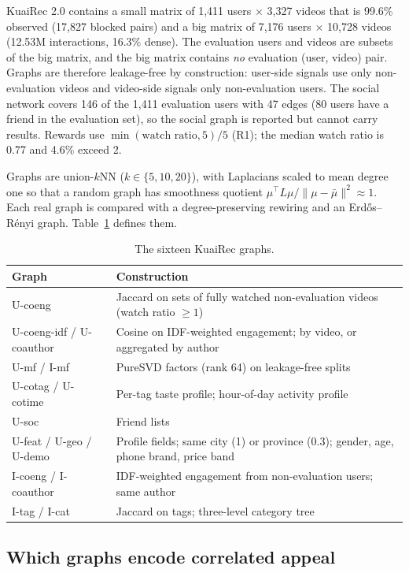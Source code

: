 \documentclass[11pt]{article}
\theoremstyle{definition}
\theoremstyle{remark}
\begin{document}
KuaiRec 2.0 contains a small matrix of 1,411 users $\times$ 3,327 videos that is 99.6\% observed (17,827 blocked pairs) and a big matrix of 7,176 users $\times$ 10,728 videos (12.53M interactions, 16.3\% dense). The evaluation users and videos are subsets of the big matrix, and the big matrix contains \emph{no} evaluation (user, video) pair. Graphs are therefore leakage-free by construction: user-side signals use only non-evaluation videos and video-side signals only non-evaluation users. The social network covers 146 of the 1,411 evaluation users with 47 edges (80 users have a friend in the evaluation set), so the social graph is reported but cannot carry results. Rewards use $\min(\text{watch ratio},5)/5$ (R1); the median watch ratio is 0.77 and 4.6\% exceed 2.

Graphs are union-$k$NN ($k\in\{5,10,20\}$), with Laplacians scaled to mean degree one so that a random graph has smoothness quotient $\mu^\top L\mu/\|\mu-\bar\mu\|^2\approx1$. Each real graph is compared with a degree-preserving rewiring and an Erd\H{o}s--R\'enyi graph. Table~\ref{tab:graphs} defines them.

\begin{table}[t]\centering\small
\begin{tabularx}{\linewidth}{lX}
\toprule
Graph & Construction \\
\midrule
U-coeng & Jaccard on sets of fully watched non-evaluation videos (watch ratio $\ge1$) \\
U-coeng-idf / U-coauthor & Cosine on IDF-weighted engagement; by video, or aggregated by author \\
U-mf / I-mf & PureSVD factors (rank 64) on leakage-free splits \\
U-cotag / U-cotime & Per-tag taste profile; hour-of-day activity profile \\
U-soc & Friend lists \\
U-feat / U-geo / U-demo & Profile fields; same city (1) or province (0.3); gender, age, phone brand, price band \\
I-coeng / I-coauthor & IDF-weighted engagement from non-evaluation users; same author \\
I-tag / I-cat & Jaccard on tags; three-level category tree \\
\bottomrule
\end{tabularx}
\caption{The sixteen KuaiRec graphs.}\label{tab:graphs}
\end{table}

\subsection{Which graphs encode correlated appeal}
\end{document}
